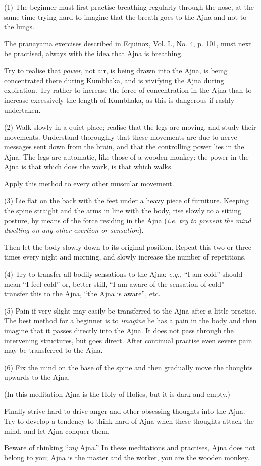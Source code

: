 (1) The beginner must first practise breathing regularly through the nose, at the same time trying hard to imagine that the breath goes to the Ajna and not to the lungs.

The pranayama exercises described in Equinox, Vol. I., No. 4, p. 101, must next be practised, always with the idea that Ajna is breathing.

Try to realise that \textit{power}, not air, is being drawn into the Ajna, is being concentrated there during Kumbhaka, and is vivifying the Ajna during expiration. Try rather to increase the force of concentration in the Ajna than to increase excessively the length of Kumbhaka, as this is dangerous if rashly undertaken.

(2) Walk slowly in a quiet place; realise that the legs are moving, and study their movements. Understand thoroughly that these movements are due to nerve messages sent down from the brain, and that the controlling power lies in the Ajna. The legs are automatic, like those of a wooden monkey: the power in the Ajna is that which does the work, is that which walks.

Apply this method to every other muscular movement.

(3) Lie flat on the back with the feet under a heavy piece of furniture. Keeping the spine straight and the arms in line with the body, rise slowly to a sitting posture, by means of the force residing in the Ajna (\textit{i.e. try to prevent the mind dwelling on any other exertion or sensation}).

Then let the body slowly down to its original position. Repeat this two or three times every night and morning, and slowly increase the number of repetitions.

(4) Try to transfer all bodily sensations to the Ajna: \textit{e.g.,} \enquote{I am cold} should mean \enquote{I feel cold} or, better still, \enquote{I am aware of the sensation of cold} --- transfer this to the Ajna, \enquote{the Ajna is aware}, etc.

(5) Pain if very slight may easily be transferred to the Ajna after a little practise. The best method for a beginner is to \textit{imagine} he has a pain in the body and then imagine that it passes directly into the Ajna. It does not pass through the intervening structures, but goes direct. After continual practise even severe pain may be transferred to the Ajna.

(6) Fix the mind on the base of the spine and then gradually move the thoughts upwards to the Ajna.

(In this meditation Ajna is the Holy of Holies, but it is dark and empty.)

Finally strive hard to drive anger and other obsessing thoughts into the Ajna. Try to develop a tendency to think hard of Ajna when these thoughts attack the mind, and let Ajna conquer them.

Beware of thinking \enquote{\textit{my} Ajna.} In these meditations and practises, Ajna does not belong to you; Ajna is the master and the worker, you are the wooden monkey.

